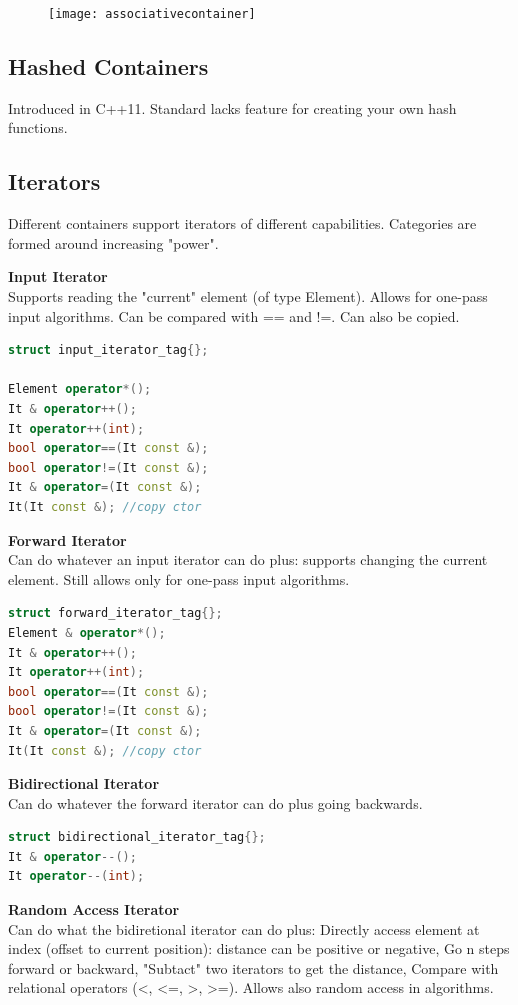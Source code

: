 \begin{figure}[h!]
  \centering
  \texttt{[image: associativecontainer]}
  \caption{}
\end{figure}


\subsection{Hashed Containers}
Introduced in C++11. Standard lacks feature for creating your own hash functions. 

\subsection{Iterators}
Different containers support iterators of different capabilities. Categories are formed around increasing "power".

\textbf{Input Iterator} \\
Supports reading the "current" element (of type Element). Allows for one-pass input algorithms.  Can be compared with == and !=. Can also be copied.

\begin{lstlisting}[language=C++]
struct input_iterator_tag{};

Element operator*();
It & operator++(); 
It operator++(int); 
bool operator==(It const &); 
bool operator!=(It const &); 
It & operator=(It const &); 
It(It const &); //copy ctor
\end{lstlisting}

\textbf{Forward Iterator} \\
Can do whatever an input iterator can do plus: supports changing the current element. Still allows only for one-pass input algorithms.
\begin{lstlisting}[language=C++]
struct forward_iterator_tag{};
Element & operator*(); 
It & operator++(); 
It operator++(int); 
bool operator==(It const &); 
bool operator!=(It const &); 
It & operator=(It const &); 
It(It const &); //copy ctor
\end{lstlisting} 

\textbf{Bidirectional Iterator}\\
Can do whatever the forward iterator can do plus going backwards.
\begin{lstlisting}[language=C++]
struct bidirectional_iterator_tag{};
It & operator--(); 
It operator--(int); 
\end{lstlisting}

\textbf{Random Access Iterator} \\
Can do what the bidiretional iterator can do plus: Directly access element at index (offset to current position): distance can be positive or negative, Go n steps forward or backward, "Subtact" two iterators to get the distance, Compare with relational operators (<, <=, >, >=).
 Allows also random access in algorithms.

